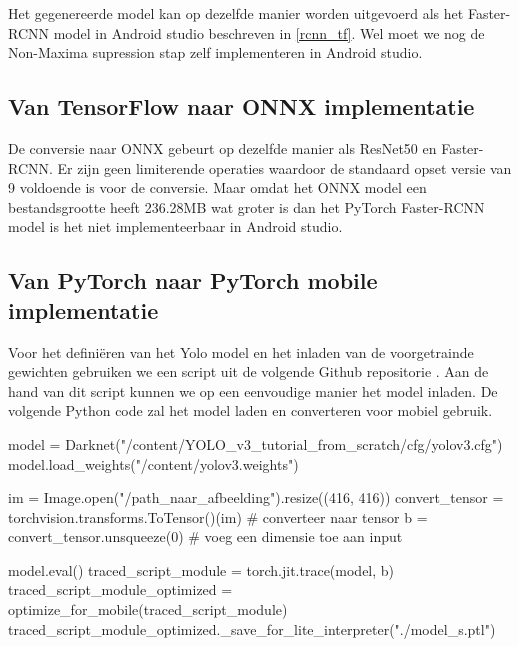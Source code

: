 Het gegenereerde model kan op dezelfde manier worden uitgevoerd als het Faster-RCNN model in Android studio beschreven in \ref{rcnn_tf}.
Wel moet we nog de Non-Maxima supression stap zelf implementeren in Android studio.

\subsection{Van TensorFlow naar ONNX implementatie}
De conversie naar ONNX gebeurt op dezelfde manier als ResNet50 en Faster-RCNN.
Er zijn geen limiterende operaties waardoor de standaard opset versie van 9 voldoende is voor de conversie.
Maar omdat het ONNX model een bestandsgrootte heeft 236.28MB wat groter is dan het PyTorch Faster-RCNN model is het niet implementeerbaar in Android studio.

\subsection{Van PyTorch naar PyTorch mobile implementatie}
Voor het defini\"eren van het Yolo model en het inladen van de voorgetrainde gewichten gebruiken we een script uit de volgende Github repositorie \cite{kathuria_pytorch_2022} .
Aan de hand van dit script kunnen we op een eenvoudige manier het model inladen.
De volgende Python code zal het model laden en converteren voor mobiel gebruik.

\begin{python}
model = Darknet("/content/YOLO_v3_tutorial_from_scratch/cfg/yolov3.cfg")
model.load_weights("/content/yolov3.weights")

im = Image.open("/path_naar_afbeelding").resize((416, 416))
convert_tensor = torchvision.transforms.ToTensor()(im) # converteer naar tensor
b = convert_tensor.unsqueeze(0) # voeg een dimensie toe aan input

model.eval()
traced_script_module = torch.jit.trace(model, b)
traced_script_module_optimized = optimize_for_mobile(traced_script_module)
traced_script_module_optimized._save_for_lite_interpreter("./model_s.ptl")
\end{python}

